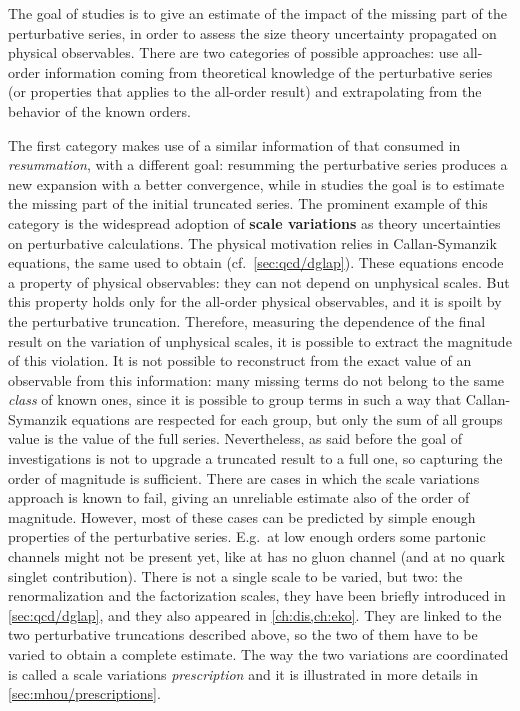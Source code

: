 
The goal of \mhou studies is to give an estimate of the impact of the missing
part of the perturbative series, in order to assess the size theory uncertainty
propagated on physical observables.
%
There are two categories of possible approaches: use all-order information
coming from theoretical knowledge of the perturbative series (or properties
that applies to the all-order result) and extrapolating from the behavior of
the known orders.

The first category makes use of a similar information of that consumed in
\textit{resummation}, with a different goal: resumming the perturbative series
produces a new expansion with a better convergence, while in \mhou studies the
goal is to estimate the missing part of the initial truncated series.
%
The prominent example of this category is the widespread adoption of
\textbf{scale variations} as theory uncertainties on perturbative calculations.
The physical motivation relies in Callan-Symanzik equations, the same used to
obtain \dglap (cf.\ \cref{sec:qcd/dglap}).
%
These equations encode a property of physical observables: they can not depend
on unphysical scales.
But this property holds only for the all-order physical observables, and it is
spoilt by the perturbative truncation.
Therefore, measuring the dependence of the final result on the variation of
unphysical scales, it is possible to extract the magnitude of this violation. 
%
It is not possible to reconstruct from the exact value of an observable from
this information: many missing terms do not belong to the same \textit{class}
of known ones, since it is possible to group terms in such a way that
Callan-Symanzik equations are respected for each group, but only the sum of all
groups value is the value of the full series.
%
Nevertheless, as said before the goal of \mhou investigations is not to upgrade
a truncated result to a full one, so capturing the order of magnitude is
sufficient.
%
There are cases in which the scale variations approach is known to fail, giving
an unreliable estimate also of the order of magnitude.
However, most of these cases can be predicted by simple enough properties of
the perturbative series.
E.g.\ at low enough orders some partonic channels might not be present yet,
like \dis at \lo has no gluon channel (and at \nlo no quark singlet
contribution).
%
There is not a single scale to be varied, but two: the renormalization and the
factorization scales, they have been briefly introduced in
\cref{sec:qcd/dglap}, and they also appeared in \cref{ch:dis,ch:eko}.
They are linked to the two perturbative truncations described above, so the two
of them have to be varied to obtain a complete estimate.
The way the two variations are coordinated is called a scale variations
\textit{prescription} and it is illustrated in more details in
\cref{sec:mhou/prescriptions}. 

